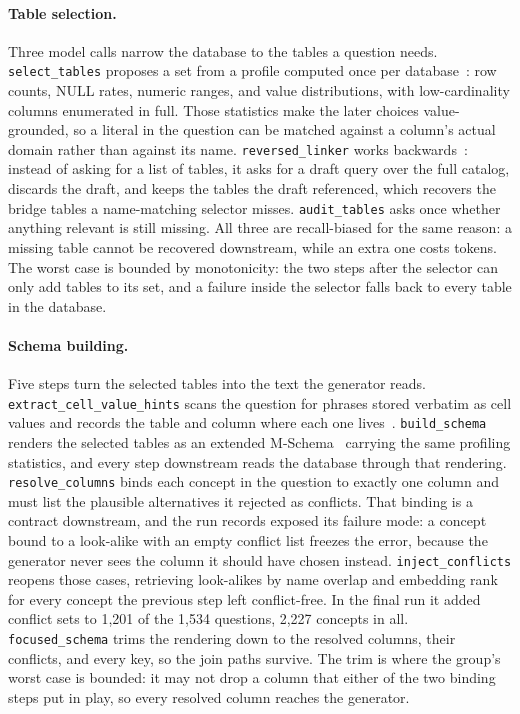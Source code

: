 \paragraph{Table selection.} Three model calls narrow the database to the
tables a question needs. \texttt{select\_tables} proposes a set from a profile
computed once per database~\cite{metadata-extraction}: row counts, NULL rates,
numeric ranges, and value distributions, with low-cardinality columns
enumerated in full. Those statistics make the later choices value-grounded, so
a literal in the question can be matched against a column's actual domain
rather than against its name. \texttt{reversed\_linker} works
backwards~\cite{deepeye-sql}: instead of asking for a list of tables, it asks
for a draft query over the full catalog, discards the draft, and keeps the
tables the draft referenced, which recovers the bridge tables a name-matching
selector misses.
\texttt{audit\_tables} asks once whether anything relevant is still missing.
All three are recall-biased for the same reason: a missing table cannot be
recovered downstream, while an extra one costs tokens. The worst case is
bounded by monotonicity: the two steps after the selector can only add tables
to its set, and a failure inside the selector falls back to every table in
the database.

\paragraph{Schema building.} Five steps turn the selected tables into the text
the generator reads. \texttt{extract\_cell\_value\_hints} scans the question
for phrases stored verbatim as cell values and records the table and column
where each one lives~\cite{deepeye-sql}. \texttt{build\_schema} renders the
selected tables as an extended M-Schema~\cite{xiyan-sql} carrying the same
profiling statistics, and every step downstream reads the database through that
rendering. \texttt{resolve\_columns} binds each concept in the question to
exactly one column and must list the plausible alternatives it rejected as
conflicts. That binding is a contract downstream, and the run records exposed
its failure mode: a concept bound to a look-alike with an empty conflict list
freezes the error, because the generator never sees the column it should have
chosen instead. \texttt{inject\_conflicts} reopens those cases, retrieving
look-alikes by name overlap and embedding rank~\cite{qwen3-embedding} for every
concept the previous step left conflict-free. In the final run it added
conflict sets to 1,201 of the 1,534 questions, 2,227 concepts in all.
\texttt{focused\_schema} trims the rendering down to the resolved columns,
their conflicts, and every key, so the join paths survive. The trim is where
the group's worst case is bounded: it may not drop a column that either of
the two binding steps put in play, so every resolved column reaches the
generator.

